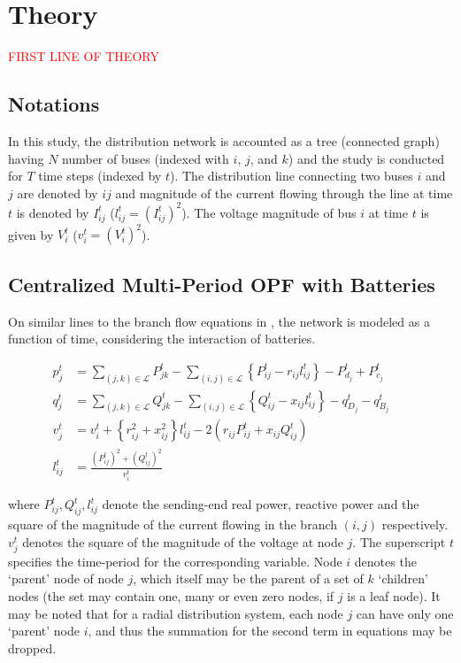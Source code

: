 \documentclass{article}
\begin{document}
\section{Theory}
\textcolor{red}{FIRST LINE OF THEORY}
\subsection{Notations}
In this study, the distribution network is accounted as a tree (connected graph) having \(N\) number of buses (indexed with \(i\), \(j\), and \(k\)) and the study is conducted for \(T\) time steps (indexed by \(t\)). The distribution line connecting two buses \(i\) and \(j\) are denoted by {\(ij\)} and magnitude of the current flowing through the line at time \(t\) is denoted by \(I_{ij}^t\) (\(l_{ij}^t=\left(I_{ij}^t\right)^2\)). The voltage magnitude of bus \(i\) at time \(t\) is given by \(V_i^t\) (\(v_i^t=\left(V_i^t\right)^2\)). 

\subsection{Centralized Multi-Period OPF with Batteries}

On similar lines to the branch flow equations in \cite{bfm01}, the network is modeled as a function of time, considering the interaction of batteries.

\begin{align}
    {p_j^t} & = {\sum_{(j, k) \in \mathcal{L}} P_{jk}^t - \sum_{(i, j) \in \mathcal{L}}\left\{P_{ij}^t - r_{ij}l_{ij}^t\right\} - P_{d_j}^t + P_{c_j}^t} && \label{eq:Pij} \\ 
    {q_j^t} & = {\sum_{(j, k) \in \mathcal{L}} Q_{jk}^t - \sum_{(i, j) \in \mathcal{L}}\left\{Q_{ij}^t - x_{ij}l_{ij}^t\right\} - q_{D_j}^t - q_{B_j}^t} && \label{eq:Qij} \\ 
    {v_j^t} & = {v_{i}^t +  \left\{r_{ij}^2 + x_{ij}^2\right\}l_{ij}^t - 2(r_{ij}P_{ij}^t + x_{ij}Q_{ij}^t)} \label{eq:vj} && \\
    {l_{ij}^t} & = {\frac{(P_{ij}^{t})^2 + (Q_{ij}^{t})^2}{v_i^t}} \label{eq:lij}
\end{align}

where $P^{t}_{ij}, Q^{t}_{ij}, l^{t}_{ij}$ denote the sending-end real power, reactive power and the square of the magnitude of the current flowing in the branch $(i, j)$ respectively. $v^{t}_{j}$ denotes the square of the magnitude of the voltage at node $j$. The superscript $t$ specifies the time-period for the corresponding variable. Node $i$ denotes the `parent' node of node $j$, which itself may be the parent of a set of $k$ `children' nodes (the set may contain one, many or even zero nodes, if $j$ is a leaf node). It may be noted that for a radial distribution system, each node $j$ can have only one `parent' node $i$, and thus the summation for the second term in equations  may be dropped.
\end{document}
